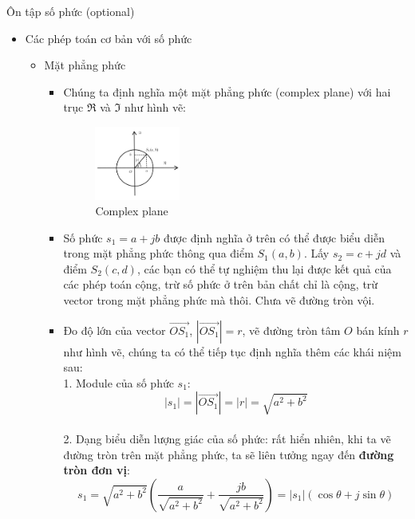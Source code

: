 \documentclass[8pt]{beamer}
\begin{document}
\begin{frame}{Ôn tập số phức (optional)}
	\begin{itemize}
		\item Các phép toán cơ bản với số phức
			\begin{itemize}
				\item Mặt phẳng phức
					\begin{itemize}
						\item Chúng ta định nghĩa một mặt phẳng phức (complex plane) với hai trục $\Re$ và $\Im$ như hình vẽ:
		\begin{figure}[h]
			\includegraphics[width=0.3\textwidth]{complex.png}
			\caption{Complex plane}			\label{fig:re5}
		\end{figure}
	\item Số phức $s_{1}=a+jb$ được định nghĩa ở trên có thể được biểu diễn trong mặt phẳng phức thông qua điểm $S_{1}(a,b)$. Lấy $s_{2}=c+jd$ và điểm $S_{2}(c,d)$, các bạn có thể tự nghiệm thu lại được kết quả của các phép toán cộng, trừ số phức ở trên bản chất chỉ là cộng, trừ vector trong mặt phẳng phức mà thôi. \alert{Chưa vẽ đường tròn vội.}
	\item Đo độ lớn của vector $\overrightarrow{OS_{1}}$, $|\overrightarrow{OS_{1}}|=r$, vẽ đường tròn tâm $O$ bán kính $r$ như hình vẽ, chúng ta có thể tiếp tục định nghĩa thêm các khái niệm sau:
		\\	1. Module của số phức $s_{1}$: $$|s_{1}|=|\overrightarrow{OS_{1}}|=|r|=\sqrt{a^2+b^2}$$
		\\ 	2. Dạng biểu diễn lượng giác của số phức: rất hiển nhiên, khi ta vẽ đường tròn trên mặt phẳng phức, ta sẽ liên tưởng ngay đến \textbf{đường tròn đơn vị}: 
		$$s_{1}=\sqrt{a^2+b^2}\left(\frac{a}{\sqrt{a^2+b^2}}+\frac{jb}{\sqrt{a^2+b^2}}\right)=|s_{1}|(\cos{\theta}+j\sin{\theta})$$
		\end{itemize}
	\end{itemize}
	\end{itemize}
\end{frame}
\end{document}
